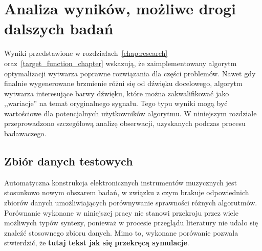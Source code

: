 \chapter{Analiza wyników, możliwe drogi dalszych badań}\label{chap:results_analysis}



Wyniki przedstawione w rozdziałach~\ref{chap:research} oraz~\ref{target_function_chapter}
wskazują, że zaimplementowany algorytm optymalizacji wytwarza poprawne rozwiązania
dla części problemów. Nawet gdy finalnie wygenerowane brzmienie różni
się od dźwięku docelowego, algorytm wytwarza interesujące barwy dźwięku,
które można zakwalifikować jako ,,wariacje'' na temat oryginalnego sygnału.
Tego typu wyniki mogą być wartościowe dla potencjalnych użytkowników algorytmu.
W niniejszym rozdziale przeprowadzono szczegółową analizę obserwacji,
uzyskanych podczas procesu badawaczego.

\section{Zbiór danych testowych} \label{sec:not_enough_benchmarking_data}


Automatyczna konstrukcja elektronicznych instrumentów muzycznych jest stosunkowo
nowym obszarem badań, w związku z czym brakuje odpowiednich zbiorów danych
umożliwiających porównywanie sprawności różnych algorutmów.
Porównanie wykonane w niniejszej pracy nie stanowi przekroju
przez wiele możliwych typów syntezy, ponieważ w procesie przeglądu
literatury nie udało się znaleźć stosownego zbioru danych. Mimo
to, wykonane porówanie pozwala stwierdzić, że
\textbf{tutaj tekst jak się przekręcą symulacje}.


